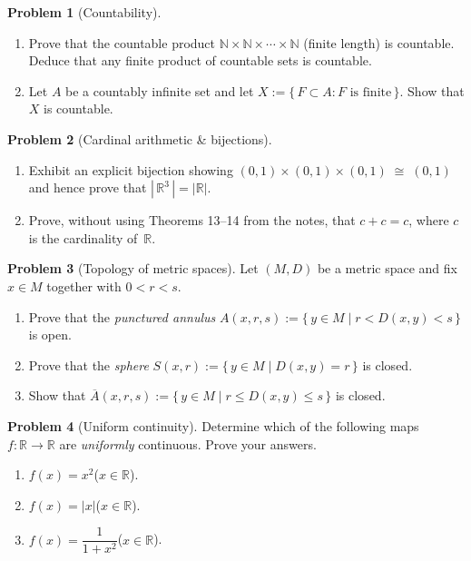 \documentclass[12pt]{article}
\theoremstyle{definition} %
\newtheorem{problem}{Problem}
\theoremstyle{plain} %
\begin{document}
\begin{problem}[Countability]
  \begin{enumerate}[label=(\alph*)]
    \item Prove that the countable product
          $\mathbb{N}\times\mathbb{N}\times\cdots\times\mathbb{N}$
          (finite length) is countable.  Deduce that any finite product
          of countable sets is countable.
    \item Let $A$ be a countably infinite set and let
          $X:=\{\,F\subset A : F\text{ is finite}\,\}$.
          Show that $X$ is countable.
  \end{enumerate}
\end{problem}

\begin{problem}[Cardinal arithmetic \& bijections]
  \begin{enumerate}[label=(\alph*)]
    \item Exhibit an explicit bijection showing
          $(0,1)\times(0,1)\times(0,1)\;\cong\;(0,1)$
          and hence prove that $|\,\mathbb{R}^{3}\,|=|\mathbb{R}|$.
    \item Prove, without using Theorems 13–14 from the notes, that
          $c+c=c$, where $c$ is the cardinality of~$\mathbb{R}$.
  \end{enumerate}
\end{problem}

\begin{problem}[Topology of metric spaces]
  Let $(M,D)$ be a metric space and fix $x\in M$ together with
  $0<r<s$.
  \begin{enumerate}[label=(\alph*)]
    \item Prove that the \emph{punctured annulus}
          $A(x,r,s):=\{\,y\in M\mid r<D(x,y)<s\,\}$ is open.
    \item Prove that the \emph{sphere}
          $S(x,r):=\{\,y\in M\mid D(x,y)=r\,\}$ is closed.
    \item Show that $\overline{A}(x,r,s)
          :=\{\,y\in M\mid r\le D(x,y)\le s\,\}$ is closed.
  \end{enumerate}
\end{problem}

\begin{problem}[Uniform continuity]
  Determine which of the following maps
  $f:\mathbb{R}\to\mathbb{R}$ are \emph{uniformly} continuous.
  Prove your answers.
  \begin{enumerate}[label=(\roman*)]
    \item $f(x)=x^{2}$\quad($x\in\mathbb{R}$).
    \item $f(x)=|x|$\quad($x\in\mathbb{R}$).
    \item $f(x)=\dfrac{1}{1+x^{2}}$\quad($x\in\mathbb{R}$).
  \end{enumerate}
\end{problem}
\end{document}
